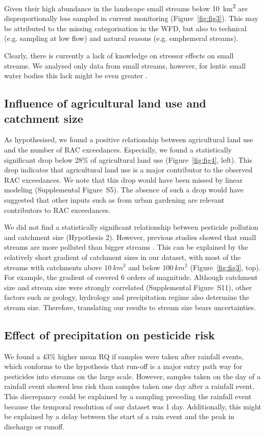 \documentclass[journal=esthag,manuscript=article]{achemso}
\begin{document}
Given their high abundance in the landscape \citep{nadeau_hydrological_2007} small streams below 10~km\textsuperscript{2} are disproportionally less sampled in current monitoring (Figure~\ref{fig:fig3}).
This may be attributed to the missing categorisation in the WFD, but also to technical (e.g. sampling at low flow) and natural reasons (e.g. emphemeral streams).

Clearly, there is currently a lack of knowledge on stressor effects on small streams.
We analysed only data from small streams, however, for lentic small water bodies this lack might be even greater \citep{lorenz_specifics_2016}. 


\subsection{Influence of agricultural land use and catchment size}
As hypothesised, we found a positive relationship between agricultural land use and the number of RAC exceedances.
Especially, we found a statistically significant drop below 28\% of agricultural land use (Figure~\ref{fig:fig4}, left).
This drop indicates that agricultural land use is a major contributor to the observed RAC exceedances. 
We note that this drop would have been missed by linear modeling (Supplemental Figure~S5). 
The absence of such a drop would have suggested that other inputs such as from urban gardening are relevant contributors to RAC exceedances.  

We did not find a statistically significant relationship between pesticide pollution and catchment size (Hypothesis 2). 
However, previous studies showed that small streams are more polluted than bigger streams \citep{schulz_field_2004,stehle_pesticide_2015,knauer_pesticides_2016}.
This can be explained by the relatively short gradient of catchment sizes in our dataset, with most of the streams with catchments above $10~km^2$ and below $100~km^2$ (Figure~\ref{fig:fig3}, top).
For example, the gradient of \citet{schulz_field_2004} covered 6 orders of magnitude. 
Although catchment size and stream size were strongly correlated (Supplemental Figure~S11), other factors such as geology, hydrology and precipitation regime also determine the stream size. 
Therefore, translating our results to stream size bears uncertainties.


\subsection{Effect of precipitation on pesticide risk}
We found a 43\% higher mean RQ if samples were taken after rainfall events, which conforms to the hypothesis that run-off is a major entry path way for pesticides into streams on the large scale.
However, samples taken on the day of a rainfall event showed less risk than samples taken one day after a rainfall event.
This discrepancy could be explained by a sampling preceding the rainfall event because the temporal resolution of our dataset was 1 day.
Additionally, this might be explained by a delay between the start of a rain event and the peak in discharge or runoff. 
\end{document}
